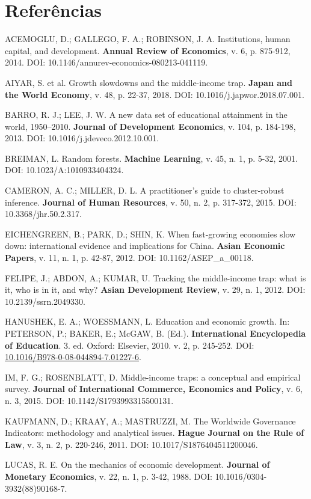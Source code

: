 \documentclass[12pt,a4paper]{article}
\begin{document}
\section*{Referências}

ACEMOGLU, D.; GALLEGO, F. A.; ROBINSON, J. A. Institutions, human capital, and development. \textbf{Annual Review of Economics}, v. 6, p. 875-912, 2014. DOI: 10.1146/annurev-economics-080213-041119.

AIYAR, S. et al. Growth slowdowns and the middle-income trap. \textbf{Japan and the World Economy}, v. 48, p. 22-37, 2018. DOI: 10.1016/j.japwor.2018.07.001.

BARRO, R. J.; LEE, J. W. A new data set of educational attainment in the world, 1950--2010. \textbf{Journal of Development Economics}, v. 104, p. 184-198, 2013. DOI: 10.1016/j.jdeveco.2012.10.001.

BREIMAN, L. Random forests. \textbf{Machine Learning}, v. 45, n. 1, p. 5-32, 2001. DOI: 10.1023/A:1010933404324.

CAMERON, A. C.; MILLER, D. L. A practitioner's guide to cluster-robust inference. \textbf{Journal of Human Resources}, v. 50, n. 2, p. 317-372, 2015. DOI: 10.3368/jhr.50.2.317.

EICHENGREEN, B.; PARK, D.; SHIN, K. When fast-growing economies slow down: international evidence and implications for China. \textbf{Asian Economic Papers}, v. 11, n. 1, p. 42-87, 2012. DOI: 10.1162/ASEP\_a\_00118.

FELIPE, J.; ABDON, A.; KUMAR, U. Tracking the middle-income trap: what is it, who is in it, and why? \textbf{Asian Development Review}, v. 29, n. 1, 2012. DOI: 10.2139/ssrn.2049330.

HANUSHEK, E. A.; WOESSMANN, L. Education and economic growth. In: PETERSON, P.; BAKER, E.; McGAW, B. (Ed.). \textbf{International Encyclopedia of Education}. 3. ed. Oxford: Elsevier, 2010. v. 2, p. 245-252. DOI: \href{https://doi.org/10.1016/B978-0-08-044894-7.01227-6}{10.1016/B978-0-08-044894-7.01227-6}.

IM, F. G.; ROSENBLATT, D. Middle-income traps: a conceptual and empirical survey. \textbf{Journal of International Commerce, Economics and Policy}, v. 6, n. 3, 2015. DOI: 10.1142/S1793993315500131.

KAUFMANN, D.; KRAAY, A.; MASTRUZZI, M. The Worldwide Governance Indicators: methodology and analytical issues. \textbf{Hague Journal on the Rule of Law}, v. 3, n. 2, p. 220-246, 2011. DOI: 10.1017/S1876404511200046.

LUCAS, R. E. On the mechanics of economic development. \textbf{Journal of Monetary Economics}, v. 22, n. 1, p. 3-42, 1988. DOI: 10.1016/0304-3932(88)90168-7.
\end{document}
